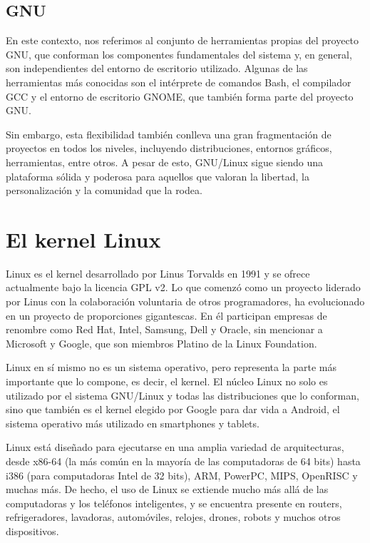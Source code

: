 \documentclass[
  jou,
  floatsintext,
  longtable,
  a4paper,
  nolmodern,
  notxfonts,
  notimes,
  12pt,
  colorlinks=true,linkcolor=blue,citecolor=blue,urlcolor=blue]{apa7}
\begin{document}
\subsection{GNU}\label{gnu}

En este contexto, nos referimos al conjunto de herramientas propias del
proyecto GNU, que conforman los componentes fundamentales del sistema y,
en general, son independientes del entorno de escritorio utilizado.
Algunas de las herramientas más conocidas son el intérprete de comandos
Bash, el compilador GCC y el entorno de escritorio GNOME, que también
forma parte del proyecto GNU.

Sin embargo, esta flexibilidad también conlleva una gran fragmentación
de proyectos en todos los niveles, incluyendo distribuciones, entornos
gráficos, herramientas, entre otros. A pesar de esto, GNU/Linux sigue
siendo una plataforma sólida y poderosa para aquellos que valoran la
libertad, la personalización y la comunidad que la rodea.

\section{El kernel Linux}\label{el-kernel-linux}

Linux es el kernel desarrollado por Linus Torvalds en 1991 y se ofrece
actualmente bajo la licencia GPL v2. Lo que comenzó como un proyecto
liderado por Linus con la colaboración voluntaria de otros
programadores, ha evolucionado en un proyecto de proporciones
gigantescas. En él participan empresas de renombre como Red Hat, Intel,
Samsung, Dell y Oracle, sin mencionar a Microsoft y Google, que son
miembros Platino de la Linux Foundation.

Linux en sí mismo no es un sistema operativo, pero representa la parte
más importante que lo compone, es decir, el kernel. El núcleo Linux no
solo es utilizado por el sistema GNU/Linux y todas las distribuciones
que lo conforman, sino que también es el kernel elegido por Google para
dar vida a Android, el sistema operativo más utilizado en smartphones y
tablets.

Linux está diseñado para ejecutarse en una amplia variedad de
arquitecturas, desde x86-64 (la más común en la mayoría de las
computadoras de 64 bits) hasta i386 (para computadoras Intel de 32
bits), ARM, PowerPC, MIPS, OpenRISC y muchas más. De hecho, el uso de
Linux se extiende mucho más allá de las computadoras y los teléfonos
inteligentes, y se encuentra presente en routers, refrigeradores,
lavadoras, automóviles, relojes, drones, robots y muchos otros
dispositivos.
\end{document}
